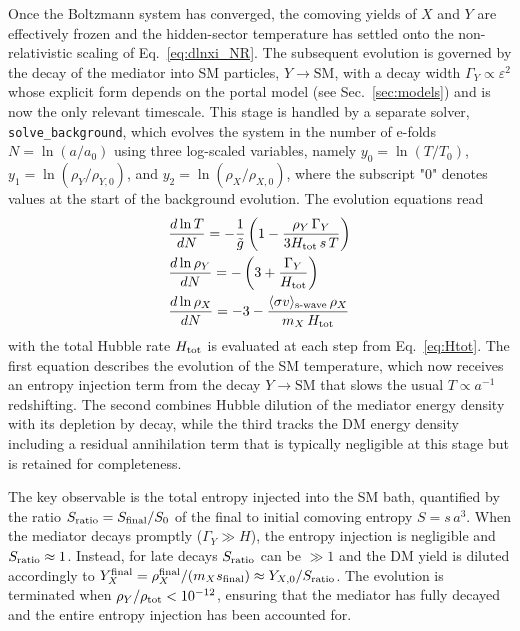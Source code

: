 \documentclass[11pt]{article}
\numberwithin{equation}{section}
\newcommand{\sigmav}{\langle\sigma v\rangle}
\newcommand{\gtilde}{\tilde{g}}
\newcommand{\mX}{m_X}
\begin{document}
Once the Boltzmann system has converged, the comoving yields of $X$ and $Y$ are effectively frozen and the hidden-sector temperature has settled onto the non-relativistic scaling of Eq.~\eqref{eq:dlnxi_NR}. The subsequent evolution is governed by the decay of the mediator into SM particles, $Y\to\mathrm{SM}$, with a decay width $\Gamma_Y \propto \varepsilon^2$ whose explicit form depends on the portal model (see Sec.~\ref{sec:models}) and is now the only relevant timescale. This stage is handled by a separate solver, \texttt{solve\_background}, which evolves the system in the number of e-folds $N = \ln(a/a_0)$ using three log-scaled variables, namely $y_0 = \ln(T/T_0)$, $y_1 =\ln(\rho_Y/\rho_{Y,0})$, and $y_2 = \ln(\rho_X/\rho_{X,0})$, where the subscript "$0$" denotes values at the start of the background evolution. The evolution equations read
\begin{align}
    &\frac{d\ln T}{dN} = -\frac{1}{\gtilde}\left(1 - \frac{\rho_Y\,\Gamma_Y}{3H_{\rm tot}\,s\, T}\right)
    \label{eq:dlnTdN} \\
    &\frac{d\ln\rho_Y}{dN} = -\left(3 + \frac{\Gamma_Y}{H_{\rm tot}}\right)
    \label{eq:dlnrhoYdN} \\
    &\frac{d\ln\rho_X}{dN} = -3 - \frac{\sigmav_{\text{s-wave}}\,\rho_X}{\mX\,H_{\rm tot}}
    \label{eq:dlnrhoXdN}
\end{align}
with the total Hubble rate $H_{\rm tot}$ is evaluated at each step from Eq.~\eqref{eq:Htot}. The first equation describes the evolution of the SM temperature, which now receives an entropy injection term from the decay $Y\to\mathrm{SM}$ that slows the usual $T\propto a^{-1}$ redshifting. The second combines Hubble dilution of the mediator energy density with its depletion by decay, while the third tracks the DM energy density including a residual annihilation term that is typically negligible at this stage but is retained for completeness.

The key observable is the total entropy injected into the SM bath, quantified by the ratio $S_{\rm ratio} = S_{\rm final}/S_0$ of the final to initial comoving entropy $S = s\,a^3$. When the mediator decays promptly ($\Gamma_Y \gg H$), the entropy injection is negligible and $S_{\rm ratio} \approx 1$. Instead, for late decays $S_{\rm ratio}$ can be $\gg 1$ and the DM yield is diluted accordingly to $Y_X^{\rm final}=\rho_X^{\rm final}/(m_X s_{\rm final})  \approx Y_{X,0}/S_{\rm ratio}$. The evolution is terminated when $\rho_Y/\rho_{\rm tot} < 10^{-12}$, ensuring that the mediator has fully decayed and the entire entropy injection has been accounted for.
\end{document}
